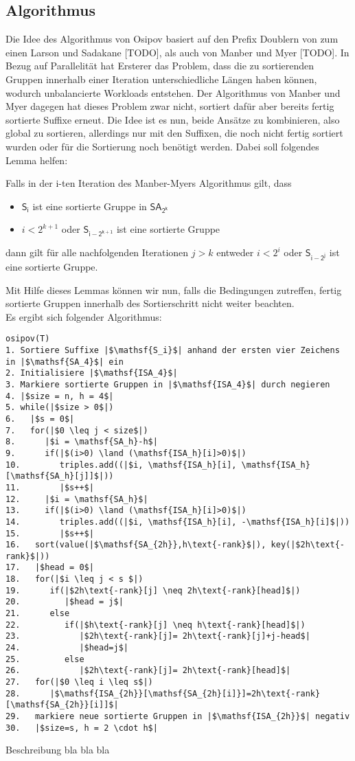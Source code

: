 \subsection{Algorithmus}
Die Idee des Algorithmus von Osipov basiert auf den Prefix Doublern von zum einen Larson und Sadakane [TODO], als auch von Manber und Myer [TODO]. In Bezug auf Parallelität hat Ersterer das Problem, dass die zu sortierenden Gruppen innerhalb einer Iteration unterschiedliche Längen haben können, wodurch unbalancierte Workloads entstehen. Der Algorithmus von Manber und Myer dagegen hat dieses Problem zwar nicht, sortiert dafür aber bereits fertig sortierte Suffixe erneut. Die Idee ist es nun, beide Ansätze zu kombinieren, also global zu sortieren, allerdings nur mit den Suffixen, die noch nicht fertig sortiert wurden oder für die Sortierung noch benötigt werden. Dabei soll folgendes Lemma helfen:
\begin{lemma}
Falls in der i-ten Iteration des Manber-Myers Algorithmus gilt, dass
\begin{itemize}
\item $\mathsf{S_i}$ ist eine sortierte Gruppe in $\mathsf{SA_{2^k}}$
\item $i < 2^{k+1}$ oder $\mathsf{S_{i-2^{k+1}}}$ ist eine sortierte Gruppe
\end{itemize} 
dann gilt für alle nachfolgenden Iterationen $j>k$ entweder $i<2^i$ oder $\mathsf{S_{i-2^j}}$ ist eine sortierte Gruppe.
\end{lemma}
Mit Hilfe dieses Lemmas können wir nun, falls die Bedingungen zutreffen, fertig sortierte Gruppen innerhalb des Sortierschritt nicht weiter beachten.\\
Es ergibt sich folgender Algorithmus:
\newpage
\begin{verbatim}
osipov(T)
1. Sortiere Suffixe |$\mathsf{S_i}$| anhand der ersten vier Zeichens in |$\mathsf{SA_4}$| ein 
2. Initialisiere |$\mathsf{ISA_4}$| 
3. Markiere sortierte Gruppen in |$\mathsf{ISA_4}$| durch negieren
4. |$size = n, h = 4$| 
5. while(|$size > 0$|)  
6.   |$s = 0$|
7.   for(|$0 \leq j < size$|)
8.      |$i = \mathsf{SA_h}-h$|
9.      if(|$(i>0) \land (\mathsf{ISA_h}[i]>0)$|)
10.        triples.add((|$i, \mathsf{ISA_h}[i], \mathsf{ISA_h}[\mathsf{SA_h}[j]]$|))
11.        |$s++$|
12.     |$i = \mathsf{SA_h}$|
13.     if(|$(i>0) \land (\mathsf{ISA_h}[i]>0)$|)
14.        triples.add((|$i, \mathsf{ISA_h}[i], -\mathsf{ISA_h}[i]$|))
15.        |$s++$|
16.   sort(value(|$\mathsf{SA_{2h}},h\text{-rank}$|), key(|$2h\text{-rank}$|))
17.   |$head = 0$|
18.   for(|$i \leq j < s $|)
19.      if(|$2h\text{-rank}[j] \neq 2h\text{-rank}[head]$|)
20.         |$head = j$|
21.      else
22.         if(|$h\text{-rank}[j] \neq h\text{-rank}[head]$|)
23.            |$2h\text{-rank}[j]= 2h\text{-rank}[j]+j-head$|
24.            |$head=j$|
25.         else
26.            |$2h\text{-rank}[j]= 2h\text{-rank}[head]$|
27.   for(|$0 \leq i \leq s$|)
28.      |$\mathsf{ISA_{2h}}[\mathsf{SA_{2h}[i]}]=2h\text{-rank}[\mathsf{SA_{2h}}[i]]$|
29.   markiere neue sortierte Gruppen in |$\mathsf{ISA_{2h}}$| negativ
30.   |$size=s, h = 2 \cdot h$| 
\end{verbatim}
Beschreibung bla bla bla
